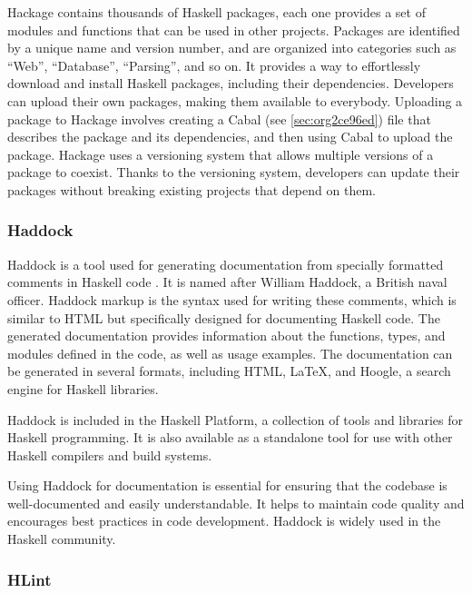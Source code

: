 \documentclass[a4paper, titlepage, twoside]{article}
\begin{document}
Hackage contains thousands of Haskell packages, each one provides a set of modules and functions that can be used in other projects. Packages are identified by a unique name and version number, and are organized into categories such as ``Web'', ``Database'', ``Parsing'', and so on. It provides a way to effortlessly download and install Haskell packages, including their dependencies. Developers can upload their own packages, making them available to everybody. Uploading a package to Hackage involves creating a Cabal (see \ref{sec:org2ce96ed}) file that describes the package and its dependencies, and then using Cabal to upload the package. Hackage uses a versioning system that allows multiple versions of a package to coexist. Thanks to the versioning system, developers can update their packages without breaking existing projects that depend on them.

\subsubsection{Haddock}
\label{sec:orgff00e2c}

Haddock is a tool used for generating documentation from specially formatted comments in Haskell code \autocite{haddockHaddockDocumentation2023}. It is named after William Haddock, a British naval officer. Haddock markup is the syntax used for writing these comments, which is similar to HTML but specifically designed for documenting Haskell code. The generated documentation provides information about the functions, types, and modules defined in the code, as well as usage examples. The documentation can be generated in several formats, including HTML, \LaTeX{}, and Hoogle, a search engine for Haskell libraries.

Haddock is included in the Haskell Platform, a collection of tools and libraries for Haskell programming. It is also available as a standalone tool for use with other Haskell compilers and build systems.

Using Haddock for documentation is essential for ensuring that the codebase is well-documented and easily understandable. It helps to maintain code quality and encourages best practices in code development. Haddock is widely used in the Haskell community.

\subsubsection{HLint}
\label{sec:org5b2e03a}
\end{document}
